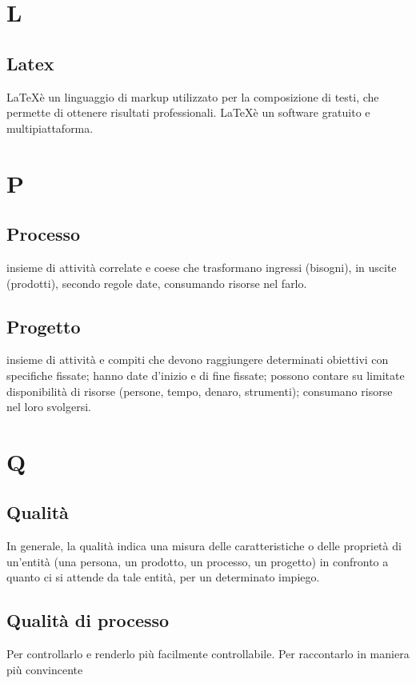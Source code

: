 \documentclass[11pt,a4paper]{article}
\begin{document}
	\section{L}
	\subsection{Latex}
	\LaTeX è un linguaggio di markup utilizzato per la composizione di testi, che permette di ottenere risultati professionali. \LaTeX è un software gratuito e multipiattaforma.
	\section{P}
	\subsection{Processo}
	insieme di attività correlate e coese che trasformano ingressi (bisogni), in uscite (prodotti), secondo regole date, consumando risorse nel farlo.

	\subsection{Progetto}
	insieme di attività e compiti che devono raggiungere determinati
obiettivi con specifiche fissate; hanno date d’inizio e di fine fissate; possono
contare su limitate disponibilità di risorse (persone, tempo, denaro, strumenti); consumano risorse nel loro svolgersi.
	\section{Q}
	\subsection{Qualità}
	In generale, la qualità indica una misura delle caratteristiche o delle proprietà di un’entità (una persona, un prodotto, un processo, un progetto) in confronto a quanto ci si attende da tale entità, per un determinato
impiego.
	\subsection{Qualità di processo}
Per controllarlo e renderlo più facilmente controllabile. Per raccontarlo in maniera più convincente
\end{document}
